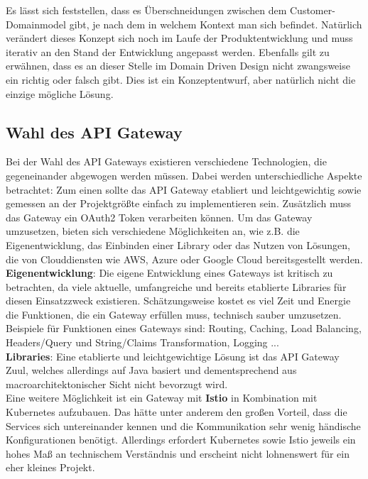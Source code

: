 {Es lässt sich feststellen, dass es Überschneidungen zwischen dem Customer-Domainmodel gibt, je nach dem in welchem Kontext man sich befindet. Natürlich verändert dieses Konzept sich noch im Laufe der Produktentwicklung und muss iterativ an den Stand der Entwicklung angepasst werden. Ebenfalls gilt zu erwähnen, dass es an dieser Stelle im Domain Driven Design nicht zwangsweise ein richtig oder falsch gibt. Dies ist ein Konzeptentwurf, aber natürlich nicht die einzige mögliche Lösung.

\subsection{Wahl des API Gateway}

Bei der Wahl des API Gateways existieren verschiedene Technologien, die gegeneinander abgewogen werden müssen. Dabei werden unterschiedliche Aspekte betrachtet: Zum einen sollte das API Gateway etabliert und leichtgewichtig sowie gemessen an der Projektgrößte einfach zu implementieren sein. Zusätzlich muss das Gateway ein OAuth2 Token verarbeiten können. Um das Gateway umzusetzen, bieten sich verschiedene Möglichkeiten an, wie z.B. die Eigenentwicklung, das Einbinden einer Library oder das Nutzen von Lösungen, die von Clouddiensten wie AWS, Azure oder Google Cloud bereitsgestellt werden. \\

\textbf{Eigenentwicklung}: Die eigene Entwicklung eines Gateways ist kritisch zu betrachten, da viele aktuelle, umfangreiche und bereits etablierte Libraries für diesen Einsatzzweck existieren. Schätzungsweise kostet es viel Zeit und Energie die Funktionen, die ein Gateway erfüllen muss, technisch sauber umzusetzen. Beispiele für Funktionen eines Gateways sind: Routing, Caching, Load Balancing, Headers/Query und String/Claims Transformation, Logging ...  \\

\textbf{Libraries}: Eine etablierte und leichtgewichtige Lösung ist das API Gateway Zuul, welches allerdings auf Java basiert und dementsprechend aus macroarchitektonischer Sicht nicht bevorzugt wird. \\

Eine weitere Möglichkeit ist ein Gateway mit \textbf{Istio} in Kombination mit Kubernetes aufzubauen. Das hätte unter anderem den großen Vorteil, dass die Services sich untereinander kennen und die Kommunikation sehr wenig händische Konfigurationen benötigt. Allerdings erfordert Kubernetes sowie Istio jeweils ein hohes Maß an technischem Verständnis und erscheint nicht lohnenswert für ein eher kleines Projekt.\cite{HeiseIstio}\cite{istioQuickstart} \\    

}

